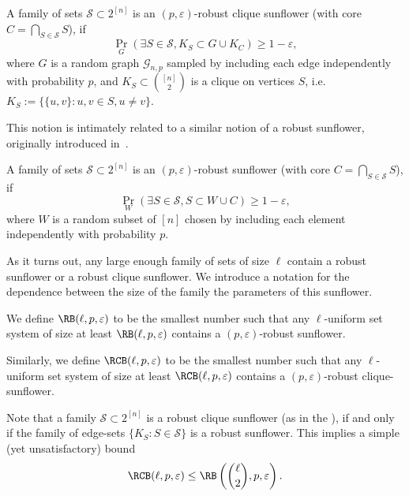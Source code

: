 \begin{definition}
\label{def:robust-clique-sunflower}
A family of sets $\mathcal{S} \subset 2^{[n]}$ is an $(p, \varepsilon)$-robust clique sunflower (with core $C = \bigcap_{S \in \mathcal{S}} S$), if 
\begin{equation*}
    \Pr_G(\exists S \in \mathcal{S}, K_S \subset G \cup K_C) \geq 1-\varepsilon,
\end{equation*} 
where $G$ is a random \ErdosRenyi graph $\mathcal{G}_{n,p}$ sampled by including each edge independently with probability $p$, and $K_S \subset \binom{[n]}{2}$ is a clique on vertices $S$, i.e. $K_S := \{ \{u, v\} : u, v \in S, u\not=v\}$.
\end{definition}
This notion is intimately related to a similar notion of a robust sunflower, originally introduced in~\cite{rossman2010monotone}.
\begin{definition}
\label{def:robust-sunflower}
A family of sets $\mathcal{S} \subset 2^{[n]}$ is an $(p, \varepsilon)$-robust sunflower (with core $C = \bigcap_{S \in \mathcal{S}} S$), if 
\begin{equation*}
    \Pr_W(\exists S \in \mathcal{S}, S \subset W \cup C) \geq 1-\varepsilon,
\end{equation*} 
where $W$ is a random subset of $[n]$ chosen by including each element independently with probability $p$.
\end{definition}
As it turns out, any large enough family of sets of size $\ell$ contain a robust sunflower or a robust clique sunflower. We introduce a notation for the dependence between the size of the family the parameters of this sunflower.
\begin{definition}
\label{def:robust-sunflower-function}
    We define $\RB(\ell, p, \varepsilon)$ to be the smallest number such that any $\ell$-uniform set system of size at least $\RB(\ell, p, \varepsilon)$ contains a $(p, \varepsilon)$-robust sunflower.

    Similarly, we define $\RCB(\ell, p, \varepsilon)$ to be the smallest number such that any $\ell$-uniform set system of size at least $\RCB(\ell, p, \varepsilon)$ contains a $(p, \varepsilon)$-robust clique-sunflower.
\end{definition}

Note that a family $\mathcal{S} \subset 2^{[n]}$ is a robust clique sunflower (as in the ), if and only if the family of edge-sets $\{ K_S : S \in \mathcal{S}\}$ is a robust sunflower.
This implies a simple (yet unsatisfactory) bound
\begin{equation}
\label{eq:simple-rcb-rb-comparison}
\RCB(\ell, p, \varepsilon) \leq \RB\left(\binom{\ell}{2}, p, \varepsilon\right).
\end{equation}

